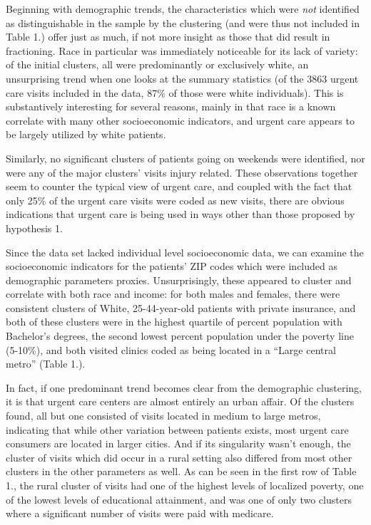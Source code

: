 \documentclass[12pt,twoside]{reedthesis}
\begin{document}
  \newpage
  
  Beginning with demographic trends, the characteristics which were
  \emph{not} identified as distinguishable in the sample by the clustering
  (and were thus not included in Table 1.) offer just as much, if not more
  insight as those that did result in fractioning. Race in particular was
  immediately noticeable for its lack of variety: of the initial clusters,
  all were predominantly or exclusively white, an unsurprising trend when
  one looks at the summary statistics (of the 3863 urgent care visits
  included in the data, 87\% of those were white individuals). This is
  substantively interesting for several reasons, mainly in that race is a
  known correlate with many other socioeconomic indicators, and urgent
  care appears to be largely utilized by white patients.
  
  Similarly, no significant clusters of patients going on weekends were
  identified, nor were any of the major clusters' visits injury related.
  These observations together seem to counter the typical view of urgent
  care, and coupled with the fact that only 25\% of the urgent care visits
  were coded as new visits, there are obvious indications that urgent care
  is being used in ways other than those proposed by hypothesis 1.
  
  Since the data set lacked individual level socioeconomic data, we can
  examine the socioeconomic indicators for the patients' ZIP codes which
  were included as demographic parameters proxies. Unsurprisingly, these
  appeared to cluster and correlate with both race and income: for both
  males and females, there were consistent clusters of White,
  25-44-year-old patients with private insurance, and both of these
  clusters were in the highest quartile of percent population with
  Bachelor's degrees, the second lowest percent population under the
  poverty line (5-10\%), and both visited clinics coded as being located
  in a ``Large central metro'' (Table 1.).
  
  In fact, if one predominant trend becomes clear from the demographic
  clustering, it is that urgent care centers are almost entirely an urban
  affair. Of the clusters found, all but one consisted of visits located
  in medium to large metros, indicating that while other variation between
  patients exists, most urgent care consumers are located in larger
  cities. And if its singularity wasn't enough, the cluster of visits
  which did occur in a rural setting also differed from most other
  clusters in the other parameters as well. As can be seen in the first
  row of Table 1., the rural cluster of visits had one of the highest
  levels of localized poverty, one of the lowest levels of educational
  attainment, and was one of only two clusters where a significant number
  of visits were paid with medicare.
  
\end{document}
